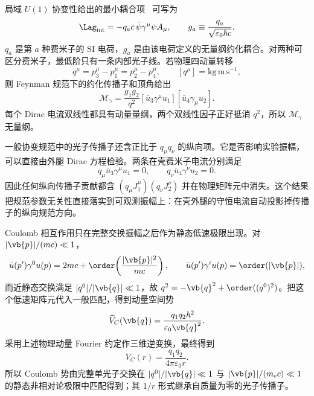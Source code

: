 局域 $U(1)$ 协变性给出的最小耦合项~ 可写为
\begin{equation}
 \Lag_{\rm int}=-q_ac\,\bar\psi\gamma^\mu\psi A_\mu,
 \qquad
 g_a\equiv\frac{q_a}{\sqrt{\varepsilon_0\hbar c}}.
 \label{eq:qed-Lint-r13}
\end{equation}
$q_a$ 是第 $a$ 种费米子的 SI 电荷，$g_a$ 是由该电荷定义的无量纲约化耦合。对两种可区分费米子，最低阶只有一条内部光子线。若物理四动量转移
\begin{equation}
 q^\mu=p_3^\mu-p_1^\mu=p_2^\mu-p_4^\mu,
 \qquad [q^\mu]=\mathrm{kg\,m\,s^{-1}},
 \label{eq:qed-transfer-q-r13}
\end{equation}
则 Feynman 规范下的约化传播子和顶角给出
\begin{equation}
 {
 \mathcal M_\gamma
 =\frac{g_1g_2}{q^2}
 [\bar u_3\gamma^\mu u_1]
 [\bar u_4\gamma_\mu u_2].}
 \label{eq:qed-reduced-exchange-r13}
\end{equation}
每个 Dirac 电流双线性都具有动量量纲，两个双线性因子正好抵消 $q^2$，所以 $\mathcal M_\gamma$ 无量纲。

一般协变规范中的光子传播子还含正比于 $q_\mu q_\nu$ 的纵向项。它是否影响实验振幅，可以直接由外腿 Dirac 方程检验。两条在壳费米子电流分别满足
\begin{equation}
 {
 q_\mu\bar u_3\gamma^\mu u_1=0,
 \qquad
 q_\nu\bar u_4\gamma^\nu u_2=0.}
 \label{eq:current-conservation-on-shell-r13}
\end{equation}
因此任何纵向传播子贡献都含 $(q_\mu J_1^\mu)(q_\nu J_2^\nu)$ 并在物理矩阵元中消失。这个结果把规范参数无关性直接落实到可观测振幅上：在壳外腿的守恒电流自动投影掉传播子的纵向规范方向。

Coulomb 相互作用只在完整交换振幅之后作为静态低速极限出现。对 $|\vb{p}|/(mc)\ll1$，
\begin{equation}
 \bar u(p')\gamma^0u(p)=2mc+\order\!\left(\frac{|\vb{p}|^2}{mc}\right),
 \qquad
 \bar u(p')\gamma^iu(p)=\order(|\vb{p}|),
 \label{eq:qed-current-nr-r13}
\end{equation}
而近静态交换满足 $|q^0|/|\vb{q}|\ll1$，故 $q^2=-\vb{q}^2+\order((q^0)^2)$。把这个低速矩阵元代入一般匹配，得到动量空间势
\begin{equation}
 {
 \widetilde V_C(\vb{q})
 =\frac{q_1q_2\hbar^2}{\varepsilon_0\vb{q}^2}.}
 \label{eq:coulomb-Vq-r13}
\end{equation}
采用上述物理动量 Fourier 约定作三维逆变换，最终得到
\begin{equation}
 {V_C(r)=\frac{q_1q_2}{4\pi\varepsilon_0r}.}
 \label{eq:coulomb-from-qed-r13}
\end{equation}
所以 Coulomb 势由完整单光子交换在 $|q^0|/|\vb{q}|\ll1$ 与 $|\vb{p}|/(m_{\mathrm e} c)\ll1$ 的静态非相对论极限中匹配得到；其 $1/r$ 形式继承自质量为零的光子传播子。

